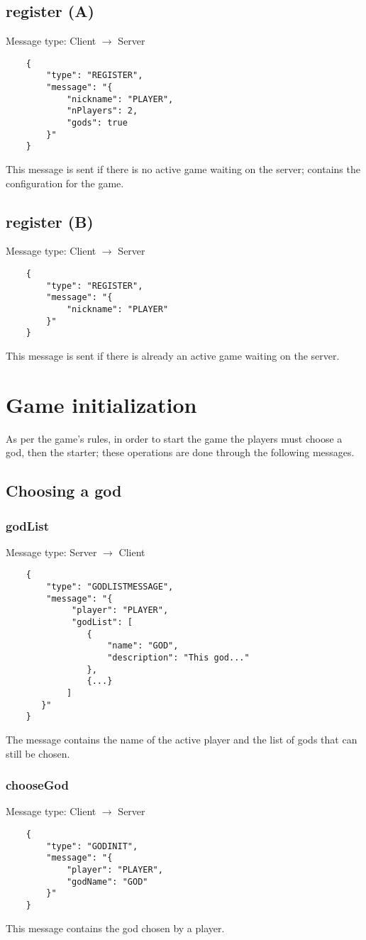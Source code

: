 \documentclass[a4paper,12pt,english]{article}
\begin{document}
	\subsection{register (A)}
	Message type: Client $\rightarrow$ Server
	\begin{verbatim}
	{
	    "type": "REGISTER",
	    "message": "{
	        "nickname": "PLAYER",
	        "nPlayers": 2,
	        "gods": true
	    }"
	}
	\end{verbatim}
	This message is sent if there is no active game waiting on the server; contains the configuration for the game.
	
	\subsection{register (B)}
	Message type: Client $\rightarrow$ Server
	\begin{verbatim}
	{
	    "type": "REGISTER",
	    "message": "{
	        "nickname": "PLAYER"
	    }"
	}
	\end{verbatim}
	This message is sent if there is already an active game waiting on the server.
	
	\section{Game initialization}
	As per the game's rules, in order to start the game the players must choose a god, then the starter; these operations are done through the following messages.
	
	\subsection{Choosing a god}
	
	\subsubsection{godList}
	Message type: Server $\rightarrow$ Client	
	\begin{verbatim}
	{
	    "type": "GODLISTMESSAGE",
	    "message": "{
	         "player": "PLAYER",
	         "godList": [
	            {
	                "name": "GOD", 
	                "description": "This god..."
	            },
	            {...}
	        ]
	   }"
	}
	\end{verbatim}
	The message contains the name of the active player and the list of gods that can still be chosen.
	
	\subsubsection{chooseGod}
	Message type: Client $\rightarrow$ Server	
	\begin{verbatim}
	{
	    "type": "GODINIT",
	    "message": "{
	        "player": "PLAYER",
	        "godName": "GOD"   
	    }"
	}
	\end{verbatim}
	This message contains the god chosen by a player.
	
\end{document}
